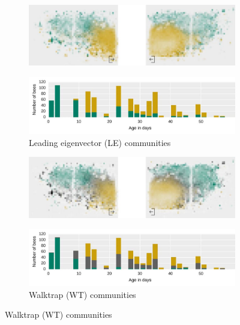 \begin{figure}[htbp]
	\centering
	\begin{subfigure}[b]{1.0\textwidth}
	\centering
	\includegraphics[width=1.0\textwidth]{Figures/le_network3.pdf}
	\end{subfigure}
	
	\begin{subfigure}[b]{1.0\textwidth}
	\centering
	\includegraphics[width=1.0\textwidth]{Figures/n3-ageDistribution-LE}
	\caption[Leading eigenvector (LE) communities]{Leading eigenvector (LE) communities}
	\label{fig:n3ageLE}
	\vspace{10mm}
	\end{subfigure}
	
	
	
	\begin{subfigure}[b]{1.0\textwidth}
	\vspace{1pt}
	\centering
	\includegraphics[width=1.0\textwidth]{Figures/wt_network3.pdf}
	\end{subfigure}
	
	\begin{subfigure}[b]{1.0\textwidth}
	\centering
	\includegraphics[width=1.0\textwidth]{Figures/n3-ageDistribution-WT}
	\caption[Walktrap (WT) communities]{Walktrap (WT) communities}
	\label{fig:n3ageWT}
	\end{subfigure}
	

\end{figure}
